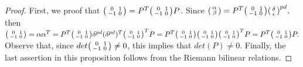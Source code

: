 \documentclass{article}
\numberwithin{equation}{section}
\numberwithin{figure}{section}
\theoremstyle{plain}
\theoremstyle{definition}
\numberwithin{equation}{section}
\newtheorem[S, bodystyle=\normalfont\noindent]{defiS}{Definition}[section]
\begin{document}
\begin{proof}
First, we proof that $\begin{psmallmatrix} 0 & 1 \\ -1& 0\end{psmallmatrix}=P^{T}\begin{psmallmatrix} 0 & 1 \\ -1& 0\end{psmallmatrix} P$. Since $\begin{psmallmatrix} \alpha \\ \beta\end{psmallmatrix}=P^T\begin{psmallmatrix} 0 & 1 \\ -1& 0\end{psmallmatrix}\begin{psmallmatrix} \delta \\ \epsilon\end{psmallmatrix}^{pd},$ then $\begin{psmallmatrix} 0 & 1 \\ -1& 0\end{psmallmatrix}=\alpha\alpha^T=P^T\begin{psmallmatrix} 0 & 1 \\ -1& 0\end{psmallmatrix}\delta^{pd}(\delta^{pd})^T\begin{psmallmatrix} 0 & 1 \\ -1& 0\end{psmallmatrix}^TP=P^T\begin{psmallmatrix} 0 & 1 \\ -1& 0\end{psmallmatrix}\begin{psmallmatrix} 0 & 1 \\ -1& 0\end{psmallmatrix}\begin{psmallmatrix} 0 & 1 \\ -1& 0\end{psmallmatrix}^{T}P=P^T \begin{psmallmatrix} 0 & 1 \\ -1& 0\end{psmallmatrix}P.$ Observe that, since $det\begin{psmallmatrix} 0 & 1 \\ -1& 0\end{psmallmatrix}\neq 0$, this implies that $det(P)\neq 0$. Finally, the last assertion in this proposition follows from the Riemann bilinear relations.
\end{proof}
\end{document}
